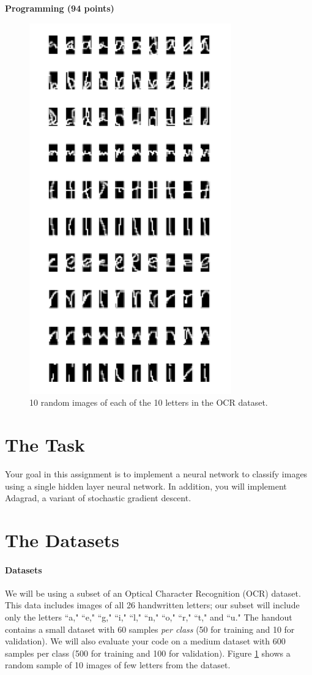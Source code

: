 \documentclass[11pt,addpoints,answers]{exam}
\begin{document}
{\LARGE \bf Programming (94 points)}

\begin{figure}[H]
    \centering
    \captionsetup{justification=centering, margin=2cm}
    \includegraphics[scale=1.0]{img/lettergrid.png}
    \caption{10 random images of each of the 10 letters in the OCR dataset.}
    \label{fig:grid}
\end{figure}

\section{The Task}
Your goal in this assignment is to implement a neural network to classify images using a single hidden layer neural network. In addition, you will implement Adagrad, a variant of stochastic gradient descent. 

\section{The Datasets}
\label{sec:dataset}

\paragraph{Datasets} We will be using a subset of an Optical Character Recognition (OCR) dataset. This data includes images of all 26 handwritten letters; our subset will include only the letters ``a," ``e," ``g," ``i," ``l," ``n," ``o," ``r," ``t," and ``u."  The handout contains a small dataset with 60 samples \textit{per class} (50 for training and 10 for validation). We will also evaluate your code on a medium dataset with 600 samples per class (500 for training and 100 for validation). Figure \ref{fig:grid} shows a random sample of 10 images of few letters from the dataset.
\end{document}
